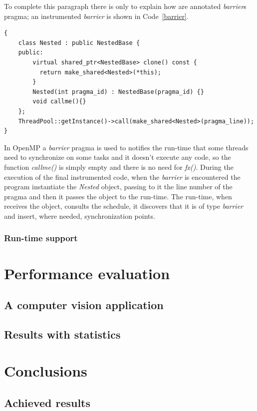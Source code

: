 \documentclass[a4paper,11pt,oneside]{book}
\begin{document}
To complete this paragraph there is only to explain how are annotated \emph{barrier}s pragma; an instrumented \emph{barrier} is shown in Code~\ref{barrier}.

\begin{lstlisting}[language=CCC, caption=Example of \emph{barrier} instrumentation., label=barrier]
{
    class Nested : public NestedBase {
    public:
        virtual shared_ptr<NestedBase> clone() const { 
          return make_shared<Nested>(*this); 
        } 
        Nested(int pragma_id) : NestedBase(pragma_id) {}
        void callme(){}
    };
    ThreadPool::getInstance()->call(make_shared<Nested>(pragma_line));
}
\end{lstlisting}


In OpenMP a \emph{barrier} pragma is used to notifies the run-time that some threads need to synchronize on some tasks and it doesn’t execute any code, so the function \emph{callme()} is simply empty and there is no need for \emph{fx()}. During the execution of the final instrumented code, when the \emph{barrier} is encountered the program instantiate the \emph{Nested} object, passing to it the line number of the pragma and then it passes the object to the run-time. The run-time, when receives the object, consults the schedule, it discovers that it is of type \emph{barrier} and insert, where needed, synchronization points. 



\subsection{Run-time support}

\chapter{Performance evaluation}
\section{A computer vision application}
\section{Results with statistics}

\chapter{Conclusions}
\section{Achieved results}
\end{document}
